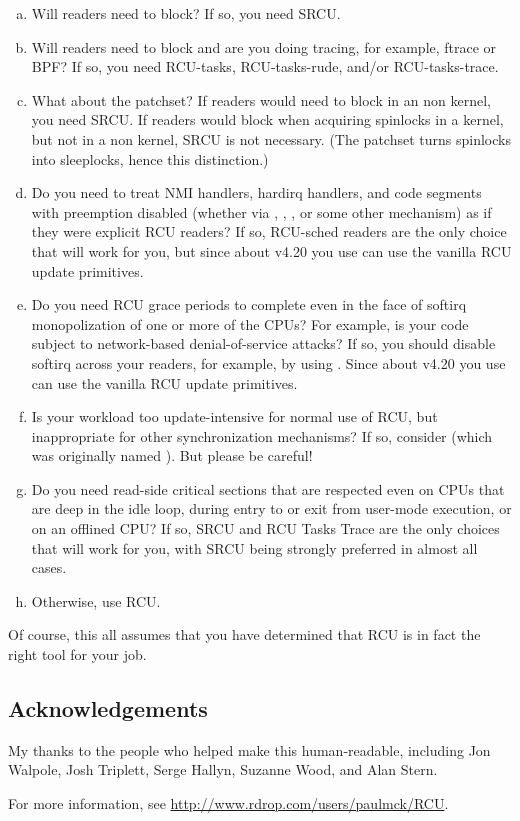 \begin{enumerate}[(a)]
\item	Will readers need to block?
	If so, you need SRCU\@.

\item	Will readers need to block and are you doing tracing, for
	example, ftrace or BPF\@?
	If so, you need RCU-tasks,
	RCU-tasks-rude, and/or RCU-tasks-trace.

\item	What about the  patchset?
	If readers would need to block in
	an non kernel, you need SRCU\@.
	If readers would block when
	acquiring spinlocks in a  kernel, but not in a non kernel,
	SRCU is not necessary.
	(The  patchset turns spinlocks into
	sleeplocks, hence this distinction.)

\item	Do you need to treat NMI handlers, hardirq handlers,
	and code segments with preemption disabled (whether
	via , , ,
	or some other mechanism) as if they were explicit RCU readers?
	If so, RCU-sched readers are the only choice that will work
	for you, but since about v4.20 you use can use the vanilla RCU
	update primitives.

\item	Do you need RCU grace periods to complete even in the face of
	softirq monopolization of one or more of the CPUs?
	For example,
	is your code subject to network-based denial-of-service attacks?
	If so, you should disable softirq across your readers, for
	example, by using .
	Since about v4.20 you
	use can use the vanilla RCU update primitives.

\item	Is your workload too update-intensive for normal use of
	RCU, but inappropriate for other synchronization mechanisms?
	If so, consider  (which was originally
	named ).
	But please be careful!

\item	Do you need read-side critical sections that are respected even
	on CPUs that are deep in the idle loop, during entry to or exit
	from user-mode execution, or on an offlined CPU\@?
	If so, SRCU
	and RCU Tasks Trace are the only choices that will work for you,
	with SRCU being strongly preferred in almost all cases.

\item	Otherwise, use RCU\@.
\end{enumerate}

Of course, this all assumes that you have determined that RCU is in fact
the right tool for your job.


\subsection*{Acknowledgements}

My thanks to the people who helped make this human-readable, including
Jon Walpole, Josh Triplett, Serge Hallyn, Suzanne Wood, and Alan Stern.


For more information, see \url{http://www.rdrop.com/users/paulmck/RCU}.
